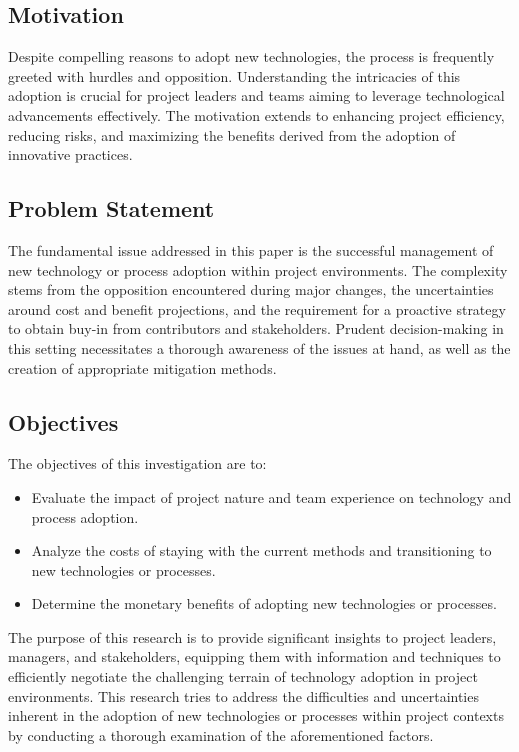 \documentclass{article}
\begin{document}
\subsection{Motivation}
Despite compelling reasons to adopt new technologies, the process is frequently greeted with hurdles and opposition. Understanding the intricacies of this adoption is crucial for project leaders and teams aiming to leverage technological advancements effectively. The motivation extends to enhancing project efficiency, reducing risks, and maximizing the benefits derived from the adoption of innovative practices.

\subsection{Problem Statement}
The fundamental issue addressed in this paper is the successful management of new technology or process adoption within project environments. The complexity stems from the opposition encountered during major changes, the uncertainties around cost and benefit projections, and the requirement for a proactive strategy to obtain buy-in from contributors and stakeholders. Prudent decision-making in this setting necessitates a thorough awareness of the issues at hand, as well as the creation of appropriate mitigation methods.

\subsection{Objectives}
The objectives of this investigation are to:
\begin{itemize}
  \item Evaluate the impact of project nature and team experience on technology and process adoption.
  \item Analyze the costs of staying with the current methods and transitioning to new technologies or processes.
  \item Determine the monetary benefits of adopting new technologies or processes.
\end{itemize} The purpose of this research is to provide significant insights to project leaders, managers, and stakeholders, equipping them with information and techniques to efficiently negotiate the challenging terrain of technology adoption in project environments. This research tries to address the difficulties and uncertainties inherent in the adoption of new technologies or processes within project contexts by conducting a thorough examination of the aforementioned factors.
\end{document}
